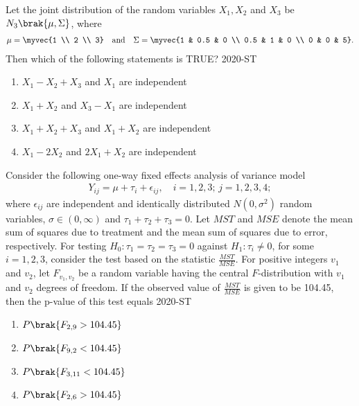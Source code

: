 \item Let the joint distribution of the random variables $X_1, X_2$ and $X_3$ be $N_3\brak{\mu, \Sigma}$, where 
\begin{align*}
\mu = \myvec{1 \\ 2 \\ 3} \quad \text{and} \quad \Sigma = \myvec{1 & 0.5 & 0 \\ 0.5 & 1 & 0 \\ 0 & 0 & 5}.
\end{align*}
Then which of the following statements is TRUE?
\hfill{2020-ST}
\begin{enumerate}
    \item $X_1 - X_2 + X_3$ and $X_1$ are independent
    \item $X_1 + X_2$ and $X_3 - X_1$ are independent
    \item $X_1 + X_2 + X_3$ and $X_1 + X_2$ are independent
    \item $X_1 - 2X_2$ and $2X_1 + X_2$ are independent
\end{enumerate}

\item Consider the following one-way fixed effects analysis of variance model
\begin{align*}
Y_{ij} = \mu + \tau_i + \epsilon_{ij}, \quad i = 1, 2, 3; \, j = 1, 2, 3, 4;
\end{align*}
where $\epsilon_{ij}$ are independent and identically distributed $N(0, \sigma^2)$ random variables, $\sigma \in (0, \infty)$ and $\tau_1 + \tau_2 + \tau_3 = 0$. Let $MST$ and $MSE$ denote the mean sum of squares due to treatment and the mean sum of squares due to error, respectively. For testing $H_0: \tau_1 = \tau_2 = \tau_3 = 0$ against $H_1: \tau_i \neq 0$, for some $i = 1, 2, 3$, consider the test based on the statistic $\frac{MST}{MSE}$. For positive integers $v_1$ and $v_2$, let $F_{v_1, v_2}$ be a random variable having the central $F$-distribution with $v_1$ and $v_2$ degrees of freedom. If the observed value of $\frac{MST}{MSE}$ is given to be 104.45, then the p-value of this test equals
\hfill{2020-ST}
\begin{enumerate}
    \item $P\brak{F_{2,9} > 104.45}$
    \item $P\brak{F_{9,2} < 104.45}$
    \item $P\brak{F_{3,11} < 104.45}$
    \item $P\brak{F_{2,6} > 104.45}$
\end{enumerate}


